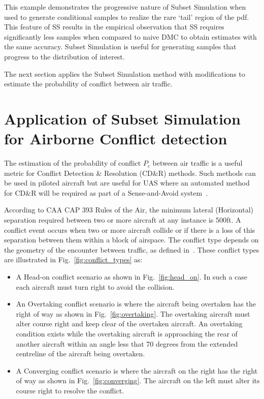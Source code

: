 \documentclass[journal]{IEEEtran}
\begin{document}
This example demonstrates the progressive nature of Subset Simulation when used to generate conditional samples to realize the rare `tail' region of the pdf. This feature of SS results in the empirical observation that SS requires significantly less samples when compared to naive DMC to obtain estimates with the same accuracy. Subset Simulation is useful for generating samples that progress to the distribution of interest. 

The next section applies the Subset Simulation method with modifications to estimate the probability of conflict between air traffic.

\section{Application of Subset Simulation for Airborne Conflict detection}
\label{sec:SS_app}

The estimation of the probability of conflict $P_{c}$ between air traffic is a useful metric for Conflict Detection \& Resolution (CD\&R) methods. Such methods can be used in piloted aircraft but are useful for UAS where an automated method for CD\&R will be required as part of a Sense-and-Avoid system~\cite{kuchar2000review}.

According to CAA CAP 393 Rules of the Air, the minimum lateral (Horizontal) separation required between two or more aircraft at any instance is 500ft. A conflict event occurs when two or more aircraft collide or if there is a loss of this separation between them within a block of airspace. The conflict type depends on the geometry of the encounter between traffic, as defined in~\cite{authority2015cap}. These conflict types are illustrated in Fig.~\ref{fig:conflict_types} as:
\begin{itemize}
	\item A Head-on conflict scenario as shown in Fig.~\ref{fig:head_on}. In such a case each aircraft must turn right to avoid the collision.
	\item An Overtaking conflict scenario is where the aircraft being overtaken has the right of way as shown in Fig.~\ref{fig:overtaking}. The overtaking aircraft must alter course right and keep clear of the overtaken aircraft. An overtaking condition exists while the overtaking aircraft is approaching the rear of another aircraft within an angle less that 70 degrees from the extended centreline of the aircraft being overtaken.
	\item A Converging conflict scenario is where the aircraft on the right has the right of way as shown in Fig.~\ref{fig:converging}. The aircraft on the left must alter its course right to resolve the conflict.
\end{itemize}
\end{document}
